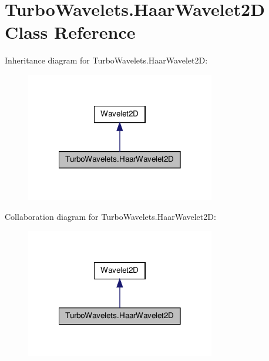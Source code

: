 \hypertarget{class_turbo_wavelets_1_1_haar_wavelet2_d}{\section{\-Turbo\-Wavelets.\-Haar\-Wavelet2\-D \-Class \-Reference}
\label{class_turbo_wavelets_1_1_haar_wavelet2_d}
}


\-Inheritance diagram for \-Turbo\-Wavelets.\-Haar\-Wavelet2\-D\-:
\nopagebreak
\begin{figure}[H]
\begin{center}
\leavevmode
\includegraphics[width=234pt]{class_turbo_wavelets_1_1_haar_wavelet2_d__inherit__graph}
\end{center}
\end{figure}


\-Collaboration diagram for \-Turbo\-Wavelets.\-Haar\-Wavelet2\-D\-:
\nopagebreak
\begin{figure}[H]
\begin{center}
\leavevmode
\includegraphics[width=234pt]{class_turbo_wavelets_1_1_haar_wavelet2_d__coll__graph}
\end{center}
\end{figure}
